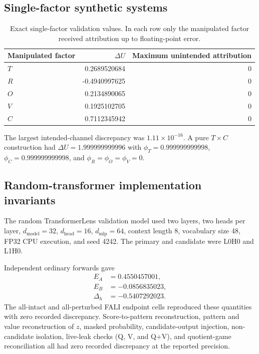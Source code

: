 \documentclass[preprint,12pt,authoryear]{elsarticle}
\begin{document}
\subsection{Single-factor synthetic systems}

\begin{table}[h]
\centering
\caption{Exact single-factor validation values. In each row only the manipulated
factor received attribution up to floating-point error.}
\begin{tabular}{lrr}
\toprule
Manipulated factor & $\Delta U$ & Maximum unintended attribution \\
\midrule
$T$ & 0.2689520684 & 0 \\
$R$ & -0.4940997625 & 0 \\
$O$ & 0.2134890065 & 0 \\
$V$ & 0.1925102705 & 0 \\
$C$ & 0.7112345942 & 0 \\
\bottomrule
\end{tabular}
\end{table}

The largest intended-channel discrepancy was
$1.11\times 10^{-16}$. A pure $T\times C$ construction had
$\Delta U=1.999999999996$ with
$\phi_T=0.999999999998$,
$\phi_C=0.999999999998$, and
$\phi_R=\phi_O=\phi_V=0$.

\subsection{Random-transformer implementation invariants}

The random TransformerLens validation model used two layers, two heads per layer,
$d_{\mathrm{model}}=32$, $d_{\mathrm{head}}=16$, $d_{\mathrm{mlp}}=64$,
context length 8, vocabulary size 48, FP32 CPU execution, and seed 4242.
The primary and candidate were L0H0 and L1H0.

Independent ordinary forwards gave
\begin{align*}
E_A&=0.4550457001,\\
E_B&=-0.0856835023,\\
\Delta_h&=-0.5407292023.
\end{align*}
The all-intact and all-perturbed FALI endpoint cells reproduced these quantities
with zero recorded discrepancy. Score-to-pattern reconstruction, pattern and
value reconstruction of $z$, masked probability, candidate-output injection,
non-candidate isolation, live-leak checks (Q, V, and Q+V), and quotient-game
reconciliation all had zero recorded discrepancy at the reported precision.
\end{document}
